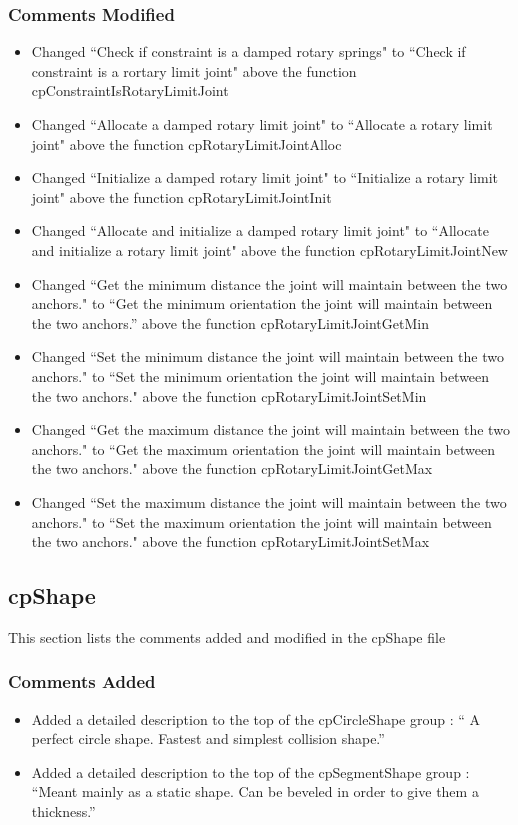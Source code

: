 \documentclass[12pt]{article}
\begin{document}
\subsubsection{Comments Modified}
\begin{itemize}
\item Changed ``Check if constraint is a damped rotary springs" to ``Check if constraint is a rortary limit joint" above the function cpConstraintIsRotaryLimitJoint
\item Changed ``Allocate a damped rotary limit joint" to ``Allocate a rotary limit joint" above the function cpRotaryLimitJointAlloc
\item Changed ``Initialize a damped rotary limit joint" to ``Initialize a rotary limit joint" above the function cpRotaryLimitJointInit
\item Changed ``Allocate and initialize a damped rotary limit joint" to ``Allocate and initialize a rotary limit joint" above the function cpRotaryLimitJointNew
\item Changed ``Get the minimum distance the joint will maintain between the two anchors." to 
		 ``Get the minimum orientation the joint will maintain between the two anchors.''  above the function cpRotaryLimitJointGetMin
\item Changed ``Set the minimum distance the joint will maintain between the two anchors." to 
		 ``Set the minimum orientation the joint will maintain between the two anchors." above the function cpRotaryLimitJointSetMin
\item Changed ``Get the maximum distance the joint will maintain between the two anchors." to 
		 ``Get the maximum orientation the joint will maintain between the two anchors." above the function cpRotaryLimitJointGetMax
\item Changed ``Set the maximum distance the joint will maintain between the two anchors." to 
		 ``Set the maximum orientation the joint will maintain between the two anchors." above the function cpRotaryLimitJointSetMax
\end{itemize}


\subsection{cpShape} 
This section lists the comments added and modified  in the cpShape file

\subsubsection{Comments Added}
\begin{itemize}
\item Added a detailed description to the top of the cpCircleShape group : `` A perfect circle shape. Fastest and simplest collision shape.''
\item Added a detailed description to the top of the cpSegmentShape group : ``Meant mainly as a static shape. Can be beveled in order to give them a thickness.''
\end{itemize}
\end{document}
